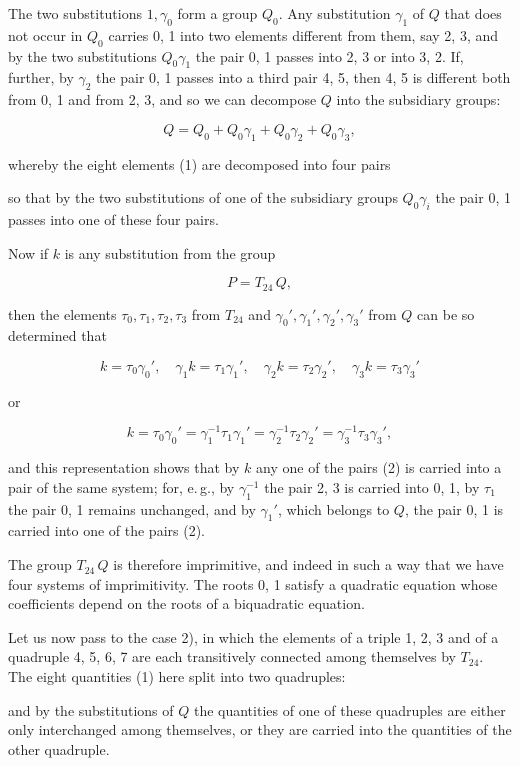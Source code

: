 The two substitutions $1, \gamma_0$ form a group $Q_0$. Any substitution $\gamma_1$ of $Q$ that does not occur in $Q_0$ carries 0, 1 into two elements different from them, say 2, 3, and by the two substitutions $Q_0\gamma_1$ the pair 0, 1 passes into 2, 3 or into 3, 2. If, further, by $\gamma_2$ the pair 0, 1 passes into a third pair 4, 5, then 4, 5 is different both from 0, 1 and from 2, 3, and so we can decompose $Q$ into the subsidiary groups:

\[
Q = Q_0 + Q_0\gamma_1 + Q_0\gamma_2 + Q_0\gamma_3,
\]

whereby the eight elements (1) are decomposed into four pairs


so that by the two substitutions of one of the subsidiary groups $Q_0\gamma_i$ the pair 0, 1 passes into one of these four pairs.

Now if $k$ is any substitution from the group

\[
P = T_{24}\,Q,
\]

then the elements $\tau_0, \tau_1, \tau_2, \tau_3$ from $T_{24}$ and $\gamma_0', \gamma_1', \gamma_2', \gamma_3'$ from $Q$ can be so determined that

\[
k = \tau_0\gamma_0', \quad \gamma_1 k = \tau_1\gamma_1', \quad \gamma_2 k = \tau_2\gamma_2', \quad \gamma_3 k = \tau_3\gamma_3'
\]

or

\[
k = \tau_0\gamma_0' = \gamma_1^{-1}\tau_1\gamma_1' = \gamma_2^{-1}\tau_2\gamma_2' = \gamma_3^{-1}\tau_3\gamma_3',
\]

and this representation shows that by $k$ any one of the pairs (2) is carried into a pair of the same system; for, e.\,g., by $\gamma_1^{-1}$ the pair 2, 3 is carried into 0, 1, by $\tau_1$ the pair 0, 1 remains unchanged, and by $\gamma_1'$, which belongs to $Q$, the pair 0, 1 is carried into one of the pairs (2).

The group $T_{24}\,Q$ is therefore imprimitive, and indeed in such a way that we have four systems of imprimitivity. The roots 0, 1 satisfy a quadratic equation whose coefficients depend on the roots of a biquadratic equation.

Let us now pass to the case 2), in which the elements of a triple 1, 2, 3 and of a quadruple 4, 5, 6, 7 are each transitively connected among themselves by $T_{24}$. The eight quantities (1) here split into two quadruples:


and by the substitutions of $Q$ the quantities of one of these quadruples are either only interchanged among themselves, or they are carried into the quantities of the other quadruple.
